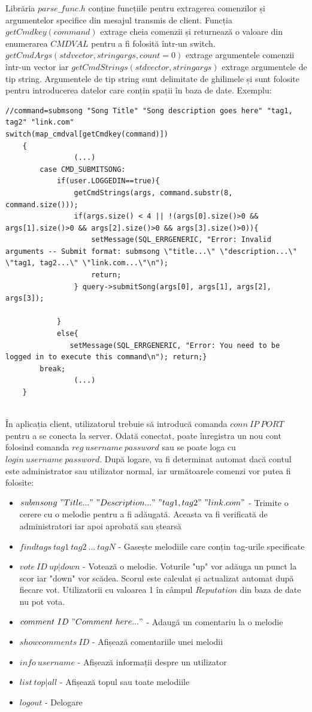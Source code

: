 \documentclass{article}
\begin{document}
Librăria $parse\_func.h$ conține funcțiile pentru extragerea comenzilor și argumentelor specifice din mesajul transmis de client. Funcția $getCmdkey(command)$ extrage cheia comenzii și returnează o valoare din enumerarea $CMDVAL$ pentru a fi folosită într-un switch. $getCmdArgs(std vector, string args, count=0)$ extrage argumentele comenzii într-un vector iar $getCmdStrings(std vector, string args)$ extrage argumentele de tip string. Argumentele de tip string sunt delimitate de ghilimele și sunt folosite pentru introducerea datelor care conțin spații în baza de date. 
Exemplu:
\begin{lstlisting}
//command=submsong "Song Title" "Song description goes here" "tag1, tag2" "link.com"
switch(map_cmdval[getCmdkey(command)])
    {
				(...)
        case CMD_SUBMITSONG:
            if(user.LOGGEDIN==true){
                getCmdStrings(args, command.substr(8, command.size()));
                if(args.size() < 4 || !(args[0].size()>0 && args[1].size()>0 && args[2].size()>0 && args[3].size()>0)){
                    setMessage(SQL_ERRGENERIC, "Error: Invalid arguments -- Submit format: submsong \"title...\" \"description...\" 	\"tag1, tag2...\" \"link.com...\"\n");
                    return;
                } query->submitSong(args[0], args[1], args[2], args[3]);
               
            }
            else{
               setMessage(SQL_ERRGENERIC, "Error: You need to be logged in to execute this command\n"); return;}
		break;
				(...)
	}
 
\end{lstlisting}

În aplicația client, utilizatorul trebuie să introducă comanda $conn\ IP\ PORT$ pentru a se conecta la server. Odată conectat, poate înregistra un nou cont folosind comanda $reg\ username\ password$ sau se poate loga cu $login\ username\ password$. După logare, va fi determinat automat dacă contul este administrator sau utilizator normal, iar următoarele comenzi vor putea fi folosite: 
\begin{itemize}
\item $submsong\ "Title..."\ "Description..."\  "tag1, tag2"\  "link.com"$ - Trimite o cerere cu o melodie pentru a fi adăugată. Aceasta va fi verificată de administratori iar apoi aprobată sau ștearsă
\item $findtags\ tag1\ tag2\ ...\ tagN$ - Gasește melodiile care conțin tag-urile specificate
\item $vote\ ID\ up|down$ - Votează o melodie. Voturile "up" vor adăuga un punct la scor iar "down" vor scădea. Scorul este calculat și actualizat automat după fiecare vot. Utilizatorii cu valoarea 1 în câmpul $Reputation$ din baza de date nu pot vota.
\item $comment\ ID\ "Comment\ here..."$ - Adaugă un comentariu la o melodie
\item $showcomments\ ID$ - Afișează comentariile unei melodii
\item $info\ username$ - Afișează informații despre un utilizator
\item $list\ top|all$ - Afișează topul sau toate melodiile
\item $logout$ - Delogare
\end{itemize}
\end{document}
